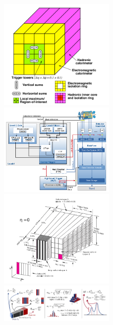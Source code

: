 \begin{figure}
  \includegraphics[width=0.5\textwidth]{images_tmp/trigger/6.png} %
  \includegraphics[width=0.5\textwidth]{images_tmp/trigger/7.png} %
  \includegraphics[width=0.5\textwidth]{images_tmp/trigger/8.png} %
  \includegraphics[width=0.5\textwidth]{images_tmp/trigger/9.png} %
\end{figure}